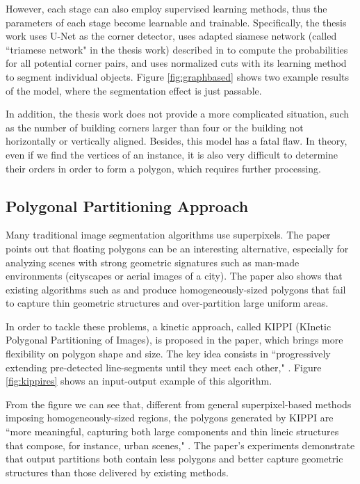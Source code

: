 However, each stage can also employ supervised learning methods, thus the parameters of each stage become learnable and trainable. Specifically, the thesis work \cite{msnadine} uses U-Net \cite{unet} as the corner detector, uses adapted siamese network (called ``triamese network" in the thesis work) described in \cite{siamese} to compute the probabilities for all potential corner pairs, and uses normalized cuts \cite{normcut} with its learning method \cite{normcutlearn} to segment individual objects. Figure \ref{fig:graphbased} shows two example results of the model, where the segmentation effect is just passable.

In addition, the thesis work does not provide a more complicated situation, such as the number of building corners larger than four or the building not horizontally or vertically aligned. Besides, this model has a fatal flaw. In theory, even if we find the vertices of an instance, it is also very difficult to determine their orders in order to form a polygon, which requires further processing.



\subsection{Polygonal Partitioning Approach}\label{ppapp}
Many traditional image segmentation algorithms use superpixels. The paper \cite{kippi} points out that floating polygons can be an interesting alternative, especially for analyzing scenes with strong geometric signatures such as man-made environments (cityscapes or aerial images of a city). The paper also shows that existing algorithms such as \cite{forsytheimgseg} and \cite{duanimgseg} produce homogeneously-sized polygons that fail to capture thin geometric structures and over-partition large uniform areas.

In order to tackle these problems, a kinetic approach, called KIPPI (KInetic Polygonal Partitioning of Images), is proposed in the paper, which brings more flexibility on polygon shape and size. The key idea consists in ``progressively extending pre-detected line-segments until they meet each other," \cite{kippi}. Figure \ref{fig:kippires} shows an input-output example of this algorithm.



From the figure we can see that, different from general superpixel-based methods imposing homogeneously-sized regions, the polygons generated by KIPPI are ``more meaningful, capturing both large components and thin lineic structures that compose, for instance, urban scenes," \cite{kippi}. The paper's experiments demonstrate that output partitions both contain less polygons and better capture geometric structures than those delivered by existing methods.

